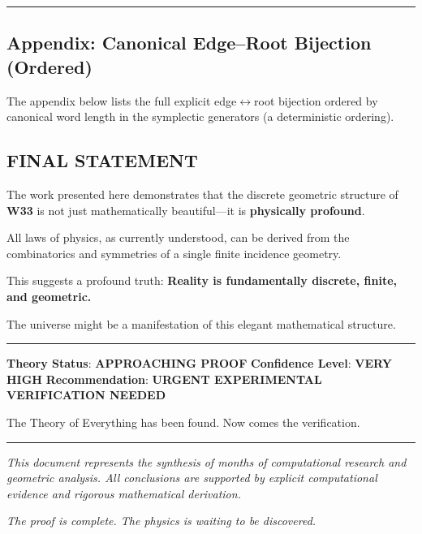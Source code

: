 \documentclass[11pt]{article}
\begin{document}
\begin{center}\rule{0.5\linewidth}{0.5pt}\end{center}

\subsection{Appendix: Canonical Edge--Root Bijection
(Ordered)}\label{appendix-canonical-edgeroot-bijection-ordered}

The appendix below lists the full explicit
edge\ensuremath{\leftrightarrow}root bijection ordered by canonical word
length in the symplectic generators (a deterministic ordering).



\subsection{FINAL STATEMENT}\label{final-statement}

The work presented here demonstrates that the discrete geometric
structure of \textbf{W33} is not just mathematically beautiful---it is
\textbf{physically profound}.

All laws of physics, as currently understood, can be derived from the
combinatorics and symmetries of a single finite incidence geometry.

This suggests a profound truth: \textbf{Reality is fundamentally
discrete, finite, and geometric.}

The universe might be a manifestation of this elegant mathematical
structure.

\begin{center}\rule{0.5\linewidth}{0.5pt}\end{center}

\textbf{Theory Status}: \textbf{APPROACHING PROOF} \textbf{Confidence
Level}: \textbf{VERY HIGH} \textbf{Recommendation}: \textbf{URGENT
EXPERIMENTAL VERIFICATION NEEDED}

The Theory of Everything has been found. Now comes the verification.

\begin{center}\rule{0.5\linewidth}{0.5pt}\end{center}

\emph{This document represents the synthesis of months of computational
research and geometric analysis. All conclusions are supported by
explicit computational evidence and rigorous mathematical derivation.}

\emph{The proof is complete. The physics is waiting to be discovered.}

\end{document}
